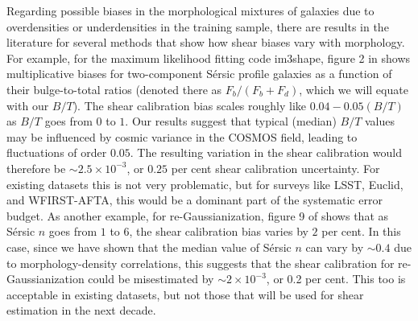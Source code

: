 \documentclass[twocolumn,useAMS,usenatbib]{mn2e}
\newcommand{\sersic}{S\'{e}rsic }
\begin{document}
Regarding possible biases in the morphological mixtures of galaxies
due to overdensities or underdensities in the training sample, there
are results in the literature for several methods that show how shear
biases vary with morphology.  For example, for the maximum likelihood
fitting code {\sc im3shape}, figure 2 in \cite{2012MNRAS.427.2711K}
shows multiplicative biases for two-component \sersic profile galaxies
as a function of their bulge-to-total ratios (denoted there as
$F_b/(F_b+F_d)$, which we will equate with our $B/T$).  The shear
calibration bias scales roughly like $0.04 - 0.05(B/T)$ as $B/T$ goes
from $0$ to $1$.  Our results suggest that typical (median) $B/T$
values may be influenced by cosmic variance in the COSMOS field,
leading to fluctuations of order $0.05$.  The resulting variation in
the shear calibration  would therefore be $\sim 2.5\times 10^{-3}$, or
$0.25$ per cent shear calibration uncertainty.  For existing datasets
this is not very problematic, but for surveys like LSST, Euclid, and
WFIRST-AFTA, this would be a dominant part of the systematic error
budget.  As another example, for re-Gaussianization, figure 9 of
\cite{2012MNRAS.420.1518M} shows that as \sersic $n$ goes from $1$ to
$6$, the shear calibration bias varies by $2$ per cent.  In this case,
since we have shown that the median value of \sersic $n$ can vary by
$\sim 0.4$ due to morphology-density correlations, this suggests that
the shear calibration for re-Gaussianization could be misestimated by
$\sim 2\times 10^{-3}$, or 0.2 per cent.  This too is acceptable in
existing datasets, but not those that will be used for shear
estimation in the next decade.
\end{document}
